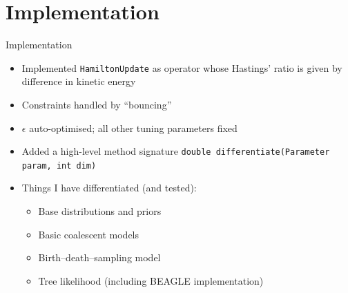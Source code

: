 \documentclass{beamer}
\begin{document}
    \section{Implementation}

    \begin{frame}{Implementation}

        \begin{itemize}

            \item Implemented \texttt{HamiltonUpdate} as operator whose Hastings' ratio is given by difference in kinetic energy

            \item Constraints handled by ``bouncing''

            \item $\epsilon$ auto-optimised; all other tuning parameters fixed

            \item Added a high-level method signature \texttt{double~differentiate(Parameter param, int dim)}

            \item Things I have differentiated (and tested):
                \begin{itemize}
                    \item Base distributions and priors
                    \item Basic coalescent models
                    \item Birth--death--sampling model
                    \item Tree likelihood (including BEAGLE implementation)
                \end{itemize}

        \end{itemize}

    \end{frame}
\end{document}

